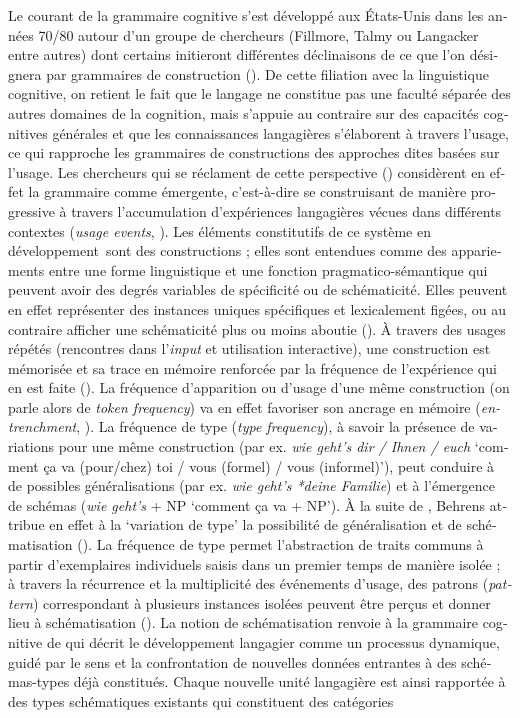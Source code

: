 \documentclass[output=paper]{langscibook}
\begin{document}
\begin{otherlanguage}{french}
\begin{sloppypar}
Le courant de la grammaire cognitive s’est développé aux États-Unis dans les années 70/80 autour d’un groupe de chercheurs (Fillmore, Talmy ou Langacker entre autres) dont certains initieront différentes déclinaisons de ce que l’on désignera par grammaires de construction (\citealt{ZiemLasch2013}). De cette filiation avec la linguistique cognitive, on retient le fait que le langage ne constitue pas une faculté séparée des autres domaines de la cognition, mais s’appuie au contraire sur des capacités cognitives générales et que les connaissances langagières s’élaborent à travers l’usage, ce qui rapproche les grammaires de constructions des approches dites basées sur l’usage. Les chercheurs qui se réclament de cette perspective (\citealt{EllisWulff2014}) considèrent en effet la grammaire comme émergente, c’est-à-dire se construisant de manière progressive à travers l’accumulation d’expériences langagières vécues dans différents contextes (\textit{usage events}, \citealt[61--62]{Tomasello2001}). Les éléments constitutifs de ce système en développement~sont des constructions ; elles sont entendues comme des appariements entre une forme linguistique et une fonction pragmatico-sémantique qui peuvent avoir des degrés variables de spécificité ou de schématicité. Elles peuvent en effet représenter des instances uniques spécifiques et lexicalement figées, ou au contraire afficher une schématicité plus ou moins aboutie (\citealt[12--13]{FrançoisEtAl2021}). À travers des usages répétés (rencontres dans l’\textit{input} et utilisation interactive), une construction est mémorisée et sa trace en mémoire renforcée par la fréquence de l’expérience qui en est faite (\citealt{PfänderBehrens2016}). La fréquence d’apparition ou d’usage d’une même construction (on parle alors de \textit{token frequency}) va en effet favoriser son ancrage en mémoire (\textit{entrenchment}, \citealt[386]{Behrens2009}). La fréquence de type (\textit{type frequency}), à savoir la présence de variations pour une même construction (par ex. \textit{wie geht’s dir / Ihnen / euch} `comment ça va (pour/chez) toi / vous (formel) / vous (informel)'), peut conduire à de possibles généralisations (par ex. \textit{wie geht’s *deine Familie}) et à l’émergence de schémas (\textit{wie geht’s} + NP `comment ça va + NP'). À la suite de \citet{Bybee2006}, Behrens attribue en effet à la ‘variation de type’ la possibilité de généralisation et de schématisation (\citealt[386]{Behrens2009}). La fréquence de type permet l’abstraction de traits communs à partir d’exemplaires individuels saisis dans un premier temps de manière isolée ; à travers la récurrence et la multiplicité des événements d’usage, des patrons (\textit{pattern}) correspondant à plusieurs instances isolées peuvent être perçus et donner lieu à schématisation (\citealt[24–28]{Legallois2021}). La notion de schématisation renvoie à la grammaire cognitive de \citet{Langacker2008a} qui décrit le développement langagier comme un processus dynamique, guidé par le sens et la confrontation de nouvelles données entrantes à des schémas-types déjà constitués. Chaque nouvelle unité langagière est ainsi rapportée à des types schématiques existants qui constituent des catégories 
\end{sloppypar}
\end{otherlanguage}
\end{document}

